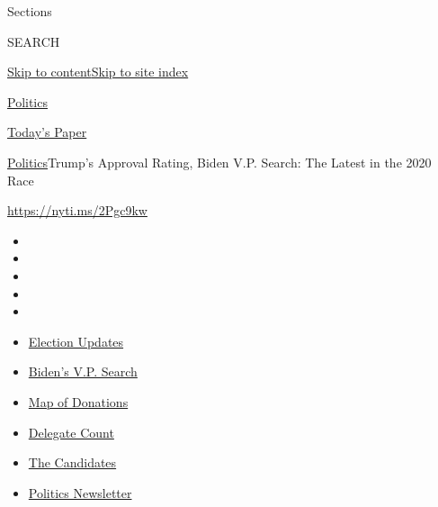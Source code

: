 Sections

SEARCH

\protect\hyperlink{site-content}{Skip to
content}\protect\hyperlink{site-index}{Skip to site index}

\href{https://www.nytimes3xbfgragh.onion/section/politics}{Politics}

\href{https://myaccount.nytimes3xbfgragh.onion/auth/login?response_type=cookie\&client_id=vi}{}

\href{https://www.nytimes3xbfgragh.onion/section/todayspaper}{Today's
Paper}

\href{/section/politics}{Politics}\textbar{}Trump's Approval Rating,
Biden V.P. Search: The Latest in the 2020 Race

\url{https://nyti.ms/2Pgc9kw}

\begin{itemize}
\item
\item
\item
\item
\item
\end{itemize}

\begin{itemize}
\item
  \href{https://www.nytimes3xbfgragh.onion/2020/07/31/us/elections/biden-vs-trump.html?action=click\&pgtype=Article\&state=default\&region=TOP_BANNER\&context=storylines_menu}{Election
  Updates}
\item
  \href{https://www.nytimes3xbfgragh.onion/article/biden-vice-president-2020.html?action=click\&pgtype=Article\&state=default\&region=TOP_BANNER\&context=storylines_menu}{Biden's
  V.P. Search}
\item
  \href{https://www.nytimes3xbfgragh.onion/interactive/2020/07/24/us/politics/trump-biden-campaign-donors.html?action=click\&pgtype=Article\&state=default\&region=TOP_BANNER\&context=storylines_menu}{Map
  of Donations}
\item
  \href{https://www.nytimes3xbfgragh.onion/interactive/2020/us/elections/delegate-count-primary-results.html?action=click\&pgtype=Article\&state=default\&region=TOP_BANNER\&context=storylines_menu}{Delegate
  Count}
\item
  \href{https://www.nytimes3xbfgragh.onion/interactive/2019/us/politics/2020-presidential-candidates.html?action=click\&pgtype=Article\&state=default\&region=TOP_BANNER\&context=storylines_menu}{The
  Candidates}
\item
  \href{https://www.nytimes3xbfgragh.onion/newsletters/politics?action=click\&pgtype=Article\&state=default\&region=TOP_BANNER\&context=storylines_menu}{Politics
  Newsletter}
\end{itemize}


